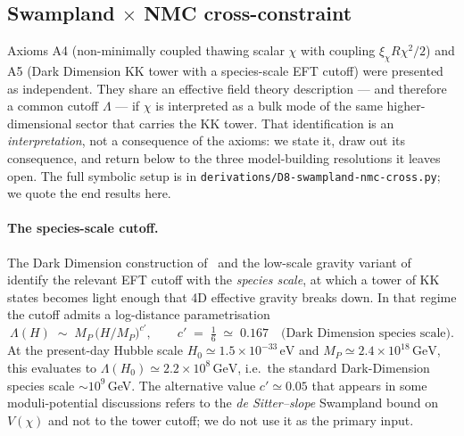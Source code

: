 
\subsection{Swampland $\times$ NMC cross-constraint}\label{sec:swampland_cross}

Axioms A4 (non-minimally coupled thawing scalar $\chi$ with coupling
$\xi_\chi R\chi^2/2$) and A5 (Dark Dimension KK tower with a species-scale
EFT cutoff) were presented as independent. They share an effective field
theory description --- and therefore a common cutoff $\Lambda$ --- if $\chi$
is interpreted as a bulk mode of the same higher-dimensional sector that
carries the KK tower. That identification is an \emph{interpretation}, not
a consequence of the axioms: we state it, draw out its consequence, and
return below to the three model-building resolutions it leaves open.
The full symbolic setup is in \texttt{derivations/D8-swampland-nmc-cross.py};
we quote the end results here.

\paragraph{The species-scale cutoff.}
The Dark Dimension construction of~\cite{Montero2022}
and the low-scale gravity variant of~\cite{AAL2023}
identify the relevant EFT cutoff with the \emph{species scale}, at which
a tower of KK states becomes light enough that 4D effective gravity
breaks down. In that regime the cutoff admits a log-distance parametrisation
\begin{equation}
  \Lambda(H)\;\sim\;M_P\,\bigl(H/M_P\bigr)^{c'},
  \qquad
  c' \;=\; \tfrac{1}{6}\;\simeq\;0.167
  \quad\text{(Dark Dimension species scale).}
  \label{eq:Lambda_SDC}
\end{equation}
At the present-day Hubble scale $H_0 \simeq 1.5\times 10^{-33}\,\mathrm{eV}$
and $M_P \simeq 2.4\times 10^{18}\,\mathrm{GeV}$, this evaluates to
$\Lambda(H_0)\simeq 2.2\times 10^{8}\,\mathrm{GeV}$, i.e.\ the standard
Dark-Dimension species scale $\sim 10^{9}$\,GeV. The alternative value
$c'\simeq 0.05$ that appears in some moduli-potential discussions refers
to the \emph{de Sitter--slope} Swampland bound on $V(\chi)$ and not to the
tower cutoff; we do not use it as the primary input.

